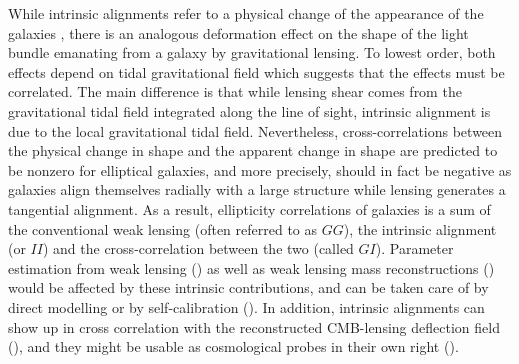 \documentclass[a4paper,fleqn,usenatbib]{mnras}
\begin{document}
While intrinsic alignments refer to a physical change of the appearance of the galaxies \cite[for reviews, see][]{kiessling_galaxy_2015, joachimi_galaxy_2015, kirk_galaxy_2015, troxel_intrinsic_2015}, there is an analogous deformation effect on the shape of the light bundle emanating from a galaxy by gravitational lensing. To lowest order, both effects depend on tidal gravitational field which suggests that the effects must be correlated. The main difference is that while lensing shear comes from the gravitational tidal field integrated along the line of sight, intrinsic alignment is due to the local gravitational tidal field. Nevertheless, cross-correlations between the physical change in shape and the apparent change in shape are predicted to be nonzero for elliptical galaxies, and more precisely, should in fact be negative as galaxies align themselves radially with a large structure while lensing generates a tangential alignment. As a result, ellipticity correlations of galaxies is a sum of the conventional weak lensing (often referred to as $GG$), the intrinsic alignment (or $II$) and the cross-correlation between the two (called $GI$). Parameter estimation from weak lensing (\cite{casarini_non-linear_2011, capranico_intrinsic_2013, PhysRevD.100.103506}) as well as weak lensing mass reconstructions (\cite{fan_intrinsic_2007, chang_dark_2017}) would be affected by these intrinsic contributions, and can be taken care of by direct modelling or by self-calibration (\cite{troxel_self-calibration_2012, yao_effects_2017, yao_self-calibration_2018, yao_separating_2019, Pedersen:2019wfp}). In addition, intrinsic alignments can show up in cross correlation with the reconstructed CMB-lensing deflection field (\cite{hirata_cross-correlation_2004, hall_intrinsic_2014, chisari_contamination_2015, larsen_intrinsic_2016, merkel_imitating_2017}), and they might be usable as cosmological probes in their own right (\cite{pandya_can_2019, 2020ApJ...891L..42T}).
\end{document}
